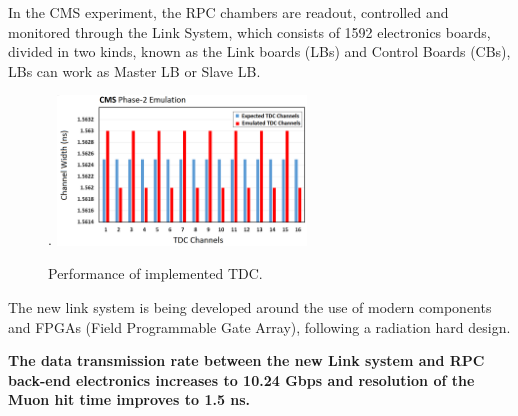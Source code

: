 




In the CMS experiment, the RPC chambers are readout, controlled and monitored through the Link System, which consists of 1592 electronics boards, divided in two kinds, known as the Link boards (LBs) and Control Boards (CBs), LBs can work as Master LB or Slave LB.  


\begin{figure}
    \caption{\footnotesize Performance of implemented TDC.}
    \label{link_system}.
    \includegraphics[width=0.59\textwidth]{uioposter-images/link_system_tdc.png}
\end{figure}


The new link system is being developed around the use of modern components and FPGAs (Field Programmable Gate Array), following a radiation hard design. 

\begin{tcolorbox}[colback=gray!5,colframe=gray!40!black]
    \textbf{The data transmission rate between the new Link system and RPC back-end electronics increases to 10.24 Gbps and resolution of the Muon hit time improves to 1.5 ns.}
\end{tcolorbox}

